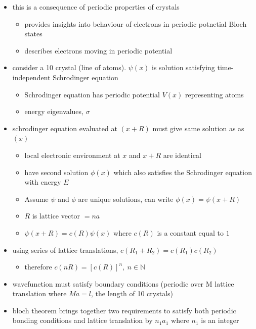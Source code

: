 \documentclass[a4paper,11pt,normalem]{article}
\begin{document}
\begin{itemize}
    \item this is a consequence of periodic properties of crystals
        \begin{itemize}
            \item provides insights into behaviour of electrons in periodic potnetial Bloch states
            \item describes electrons moving in periodic potential
        \end{itemize}
    \item consider a 10 crystal (line of atoms). \(\psi(x)\) is solution satisfying time-independent Schrodinger equation
        \begin{itemize}
            \item Schrodinger equation has periodic potential \(V(x)\) representing atoms
            \item energy eigenvalues, \(\sigma\)
        \end{itemize}
    \item schrodinger equation evaluated at \((x+R)\) must give same solution as as \((x)\)
        \begin{itemize}
            \item local electronic environment at \(x\) and \(x+R\) are identical
            \item have second solution \(\phi(x)\) which also satisfies the Schrodinger equation with energy \(E\)
            \item Assume \(\psi\) and \(\phi\) are unique solutions, can write \(\phi(x) = \psi(x+R)\)
            \item \(R\) is lattice vector \(=na\)
            \item \(\psi(x+R) = c(R)\psi(x)\) where \(c(R)\) is a constant equal to \(1\)
        \end{itemize}
    \item using series of lattice translations, \(c(R_1+R_2) = c(R_1)c(R_2)\)
        \begin{itemize}
            \item therefore \(c(nR) = [c(R)]^n,~ n \in \mathbb{N}\)
        \end{itemize}
    \item wavefunction must satisfy boundary conditions (periodic over M lattice translation where \(Ma = l\), the length of 10 crystals)
    \item bloch theorem brings together two requirements to satisfy both periodic bonding conditions and lattice translation by \(n_1a_1\) where \(n_1\) is an integer

\end{itemize}
\end{document}
